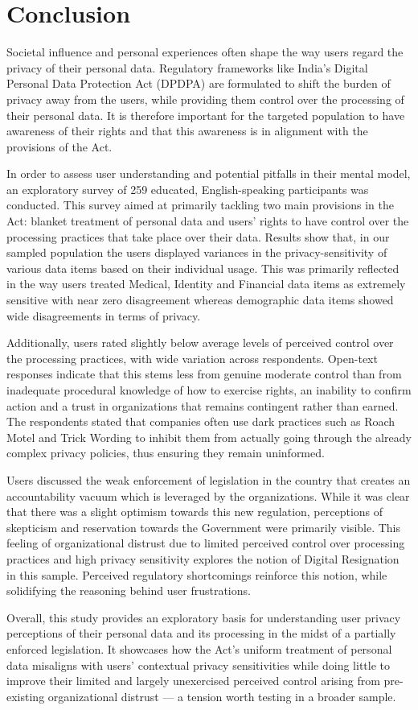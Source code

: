 \chapter{Conclusion} \label{chapter:conclusion}

Societal influence and personal experiences often shape the way users regard the privacy of their personal data. Regulatory frameworks like India's Digital Personal Data Protection Act (DPDPA) are formulated to shift the burden of privacy away from the users, while providing them control over the processing of their personal data. It is therefore important for the targeted population to have awareness of their rights and that this awareness is in alignment with the provisions of the Act.

In order to assess user understanding and potential pitfalls in their mental model, an exploratory survey of 259 educated, English-speaking participants was conducted. This survey aimed at primarily tackling two main provisions in the Act: blanket treatment of personal data and users' rights to have control over the processing practices that take place over their data. Results show that, in our sampled population the users displayed variances in the privacy-sensitivity of various data items based on their individual usage. This was primarily reflected in the way users treated Medical, Identity and Financial data items as extremely sensitive with near zero disagreement whereas demographic data items showed wide disagreements in terms of privacy. 

Additionally, users rated slightly below average levels of perceived control over the processing practices, with wide variation across respondents. Open-text responses indicate that this stems less from genuine moderate control than from inadequate procedural knowledge of how to exercise rights, an inability to confirm action and a trust in organizations that remains contingent rather than earned. The respondents stated that companies often use dark practices such as Roach Motel and Trick Wording to inhibit them from actually going through the already complex privacy policies, thus ensuring they remain uninformed. 

Users discussed the weak enforcement of legislation in the country that creates an accountability vacuum which is leveraged by the organizations. While it was clear that there was a slight optimism towards this new regulation, perceptions of skepticism and reservation towards the Government were primarily visible. This feeling of organizational distrust due to limited perceived control over processing practices and high privacy sensitivity explores the notion of Digital Resignation in this sample. Perceived regulatory shortcomings reinforce this notion, while solidifying the reasoning behind user frustrations. 

Overall, this study provides an exploratory basis for understanding user privacy perceptions of their personal data and its processing in the midst of a partially enforced legislation. It showcases how the Act's uniform treatment of personal data misaligns with users' contextual privacy sensitivities while doing little to improve their limited and largely unexercised perceived control arising from pre-existing organizational distrust --- a tension worth testing in a broader sample.